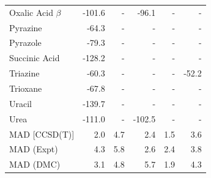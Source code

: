 \begin{table}[h]
\begin{tabular}{lrrrrr}
Oxalic Acid $\beta$ & -101.6 & - & -96.1 & - & - \\
Pyrazine & -64.3 & - & - & - & - \\
Pyrazole & -79.3 & - & - & - & - \\
Succinic Acid & -128.2 & - & - & - & - \\
Triazine & -60.3 & - & - & - & -52.2 \\
Trioxane & -67.8 & - & - & - & - \\
Uracil & -139.7 & - & - & - & - \\
Urea & -111.0 & - & -102.5 & - & - \\
MAD [CCSD(T)] & 2.0 & 4.7 & 2.4 & 1.5 & 3.6 \\
MAD (Expt) & 4.3 & 5.8 & 2.6 & 2.4 & 3.8 \\
MAD (DMC) & 3.1 & 4.8 & 5.7 & 1.9 & 4.3 \\
\bottomrule
\end{tabular}

\end{table}